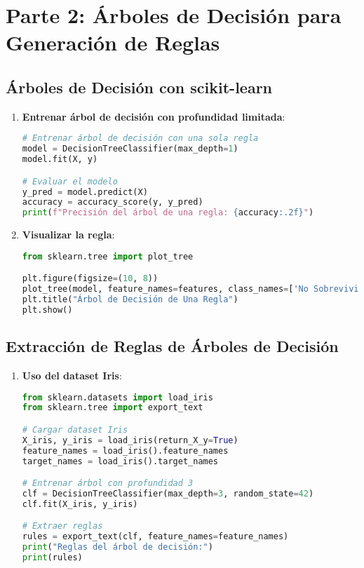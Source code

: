 \documentclass[a4paper,12pt]{article}
\begin{document}
\section{Parte 2: Árboles de Decisión para Generación de Reglas}

\subsection{Árboles de Decisión con scikit-learn}
\begin{enumerate}
    \item \textbf{Entrenar árbol de decisión con profundidad limitada}:
    \begin{lstlisting}[language=Python]
# Entrenar árbol de decisión con una sola regla
model = DecisionTreeClassifier(max_depth=1)
model.fit(X, y)

# Evaluar el modelo
y_pred = model.predict(X)
accuracy = accuracy_score(y, y_pred)
print(f"Precisión del árbol de una regla: {accuracy:.2f}")
    \end{lstlisting}
    
    \item \textbf{Visualizar la regla}:
    \begin{lstlisting}[language=Python]
from sklearn.tree import plot_tree

plt.figure(figsize=(10, 8))
plot_tree(model, feature_names=features, class_names=['No Sobrevivió', 'Sobrevivió'], filled=True)
plt.title("Árbol de Decisión de Una Regla")
plt.show()
    \end{lstlisting}
\end{enumerate}

\subsection{Extracción de Reglas de Árboles de Decisión}
\begin{enumerate}
    \item \textbf{Uso del dataset Iris}:
    \begin{lstlisting}[language=Python]
from sklearn.datasets import load_iris
from sklearn.tree import export_text

# Cargar dataset Iris
X_iris, y_iris = load_iris(return_X_y=True)
feature_names = load_iris().feature_names
target_names = load_iris().target_names

# Entrenar árbol con profundidad 3
clf = DecisionTreeClassifier(max_depth=3, random_state=42)
clf.fit(X_iris, y_iris)

# Extraer reglas
rules = export_text(clf, feature_names=feature_names)
print("Reglas del árbol de decisión:")
print(rules)
    \end{lstlisting}
\end{enumerate}
\end{document}
